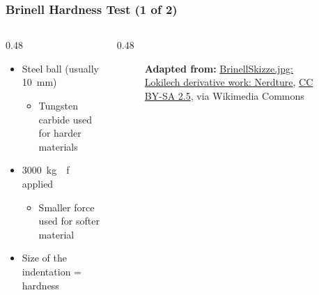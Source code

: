\begin{frame}
	\frametitle{Brinell Hardness Test (1 of 2)}

    \begin{columns}
        \begin{column}{0.48\linewidth}
            \begin{itemize}[<+- | alert@+>]
                \item Steel ball (usually \qty{10}{\milli\meter})
                    \begin{itemize}
                        \item Tungsten carbide used for harder materials 
                    \end{itemize}
                \item \qty{3000}{\kilogram{}f} applied 
                    \begin{itemize}
                        \item Smaller force used for softer material
                    \end{itemize}
                \item Size of the indentation = hardness
            \end{itemize}
        \end{column}
        \begin{column}{0.48\linewidth}
            \begin{figure}
                \centering
                \resizebox{0.375\linewidth}{!}{
                    
                }

                \vspace{0.5em}
                {\tiny \textbf{Adapted from:} \href{https://commons.wikimedia.org/wiki/File:BrinellHardness.svg}{BrinellSkizze.jpg: Lokilech derivative work: Nerdture}, \href{https://creativecommons.org/licenses/by-sa/2.5}{CC BY-SA 2.5}, via Wikimedia Commons\par}
            \end{figure}
        \end{column}
    \end{columns}
\end{frame}


